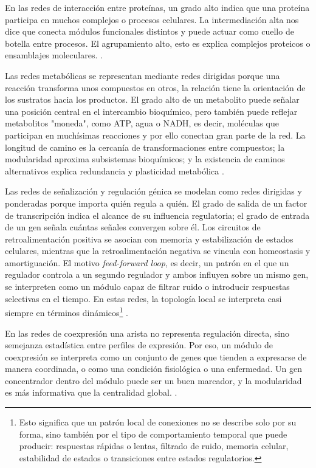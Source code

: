 \documentclass[11pt]{article}
\begin{document}
En las redes de interacción entre proteínas, un grado alto indica que una proteína participa en muchos complejos o procesos celulares. La intermediación alta nos dice que conecta módulos funcionales distintos y puede actuar como cuello de botella entre procesos. El agrupamiento alto, esto es explica complejos proteicos o ensamblajes moleculares.  \parencite{Jeong2001,Joy2005,Koutrouli2020}.

Las redes metabólicas se representan mediante redes dirigidas porque una reacción transforma unos compuestos en otros, la relación tiene la orientación de los sustratos hacia los productos. El grado alto de un metabolito puede señalar una posición central en el intercambio bioquímico, pero también puede reflejar metabolitos "moneda", como ATP, agua o NADH, es decir, moléculas que participan en muchísimas reacciones y por ello conectan gran parte de la red. La longitud de camino es la cercanía de transformaciones entre compuestos; la modularidad aproxima subsistemas bioquímicos; y la existencia de caminos alternativos explica redundancia y plasticidad metabólica \parencite{Koutrouli2020,EmmertStreib2015}.

Las redes de señalización y regulación génica se modelan como redes dirigidas y ponderadas porque importa quién regula a quién. El grado de salida de un factor de transcripción indica el alcance de su influencia regulatoria; el grado de entrada de un gen señala cuántas señales convergen sobre él. Los circuitos de retroalimentación positiva se asocian con memoria y estabilización de estados celulares, mientras que la retroalimentación negativa se vincula con homeostasis y amortiguación. El motivo \textit{feed-forward loop}, es decir, un patrón en el que un regulador controla a un segundo regulador y ambos influyen sobre un mismo gen, se interpreten como un módulo capaz de filtrar ruido o introducir respuestas selectivas en el tiempo. En estas redes, la topología local se interpreta casi siempre en términos dinámicos\footnote{Esto significa que un patrón local de conexiones no se describe solo por su forma, sino también por el tipo de comportamiento temporal que puede producir: respuestas rápidas o lentas, filtrado de ruido, memoria celular, estabilidad de estados o transiciones entre estados regulatorios.} 
\parencite{EmmertStreib2014,BanfRhee2017}. 

En las redes de coexpresión una arista no representa regulación directa, sino semejanza estadística entre perfiles de expresión. Por eso, un módulo de coexpresión se interpreta como un  conjunto de genes que tienden a expresarse de manera coordinada, o como una condición fisiológica o una enfermedad. Un gen concentrador dentro del módulo puede ser un buen marcador, y la modularidad es más informativa que la centralidad global. \parencite{ZhangHorvath2005,Zheng2021,Gnanakkumaar2019}.
\end{document}
